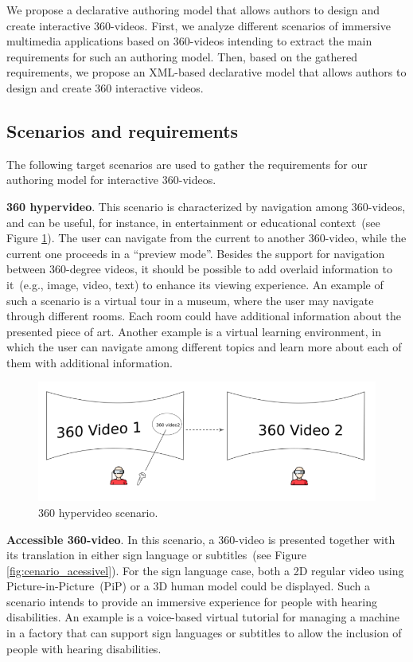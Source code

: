 We propose a declarative authoring model that allows authors to design and create interactive 360-videos.
First, we analyze different scenarios of immersive multimedia applications based on 360-videos intending to extract the main requirements for such an authoring model.
Then, based on the gathered requirements, we propose an XML-based declarative model that allows authors to design and create 360 interactive videos.

\subsection{Scenarios and requirements}
\label{subsec:authoring_scenarios}

The following target scenarios are used to gather the requirements for our authoring model for interactive 360-videos.

\textbf{360 hypervideo}.
This scenario is characterized by navigation among 360-videos, and can be useful, for instance, in entertainment or educational context~(see Figure \ref{fig:cenario_hiper}). The user can navigate from the current to another 360-video, while the current one proceeds in a ``preview mode''. Besides the support for navigation between 360-degree videos, it should be possible to add overlaid information to it~(e.g., image, video, text) to enhance its viewing experience. An example of such a scenario is a virtual tour in a museum, where the user may navigate through different rooms. Each room could have additional information about the presented piece of art. Another example is a virtual learning environment, in which the user can navigate among different topics and learn more about each of them with additional information.

\begin{figure}[!ht]
    \centering
    \includegraphics[width=0.7\linewidth]{img/video360/hyper.png}
    \caption{360 hypervideo scenario.}
    \label{fig:cenario_hiper}
\end{figure}

\textbf{Accessible 360-video}. 
In this scenario, a 360-video is presented together with its translation in either sign language or subtitles~(see Figure \ref{fig:cenario_acessivel}). For the sign language case, both a 2D regular video using Picture-in-Picture~(PiP) or a 3D human model could be displayed. Such a scenario intends to provide an immersive experience for people with hearing disabilities. An example is a voice-based virtual tutorial for managing a machine in a factory that can support sign languages or subtitles to allow the inclusion of people with hearing disabilities.

